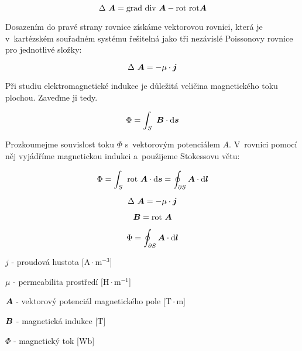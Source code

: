 \begin{equation}
\Delta \ \vect{A} = \grad \ \diverg \ \vect{A} - \rot \ \rot \vect{A} 
\end{equation}

Dosazením do pravé strany rovnice získáme vektorovou rovnici, která je v~kartézském souřadném systému řešitelná jako tři nezávislé Poissonovy rovnice pro jednotlivé složky:

\begin{equation}
\Delta \ \boldsymbol{A} = -\mu \cdot \boldsymbol{j}
\end{equation}

Při studiu elektromagnetické indukce je důležitá veličina magnetického toku plochou. Zaveďme ji tedy.

\begin{equation}
\Phi = \int_S \ \boldsymbol{B} \cdot \mathrm{d}\boldsymbol{s}
\end{equation}

Prozkoumejme souvislost toku \(\Phi\) s~vektorovým potenciálem \(A\). V~rovnici pomocí něj vyjádříme magnetickou indukci a~použijeme Stokessovu větu:

\begin{equation}
\Phi = \int_S \ \mathrm{rot} \ \boldsymbol{A} \cdot \mathrm{d}\boldsymbol{s} = \oint_{\partial S} \boldsymbol{A} \cdot \mathrm{d}\boldsymbol{l}
\end{equation}

\begin{fact}
\begin{equation}
\Delta \ \boldsymbol{A} = -\mu \cdot \boldsymbol{j}
\end{equation}

\begin{equation}
\boldsymbol{B} = \mathrm{rot} \ \boldsymbol{A}
\end{equation}

\begin{equation}
\Phi = \oint_{\partial S} \boldsymbol{A} \cdot \mathrm{d}\boldsymbol{l}
\end{equation}

\(j\) - proudová hustota [\(\mathrm{A} \cdot \mathrm{m}^{-3}\)]

\(\mu\) - permeabilita prostředí [\(\mathrm{H} \cdot \mathrm{m}^{-1}\)]

\(\boldsymbol{A}\) - vektorový potenciál magnetického pole [\(\mathrm{T} \cdot \mathrm{m}\)]

\(\boldsymbol{B}\) - magnetická indukce [\(\mathrm{T}\)]

\(\Phi\) - magnetický tok [\(\mathrm{Wb}\)]
\end{fact}
